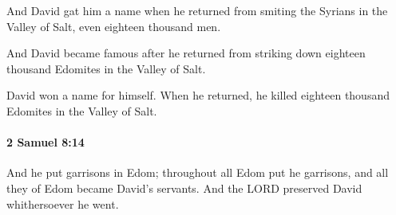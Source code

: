 			\begin{versebox}
					\item[BHS] 
					\item[ASV] And David gat him a name when he returned from smiting the Syrians in the Valley of Salt, even eighteen thousand men.
					\item[NIV] And David became famous after he returned from striking down eighteen thousand Edomites in the Valley of Salt.
					\item[NRSV] David won a name for himself. When he returned, he killed eighteen thousand Edomites in the Valley of Salt.
			\end{versebox}

		\paragraph{2 Samuel 8:14} %
			\label{2SAMUEL-8-14}

			And he put garrisons in Edom; throughout all Edom put he garrisons, and all they of Edom became David’s servants. And the LORD preserved David whithersoever he went.

